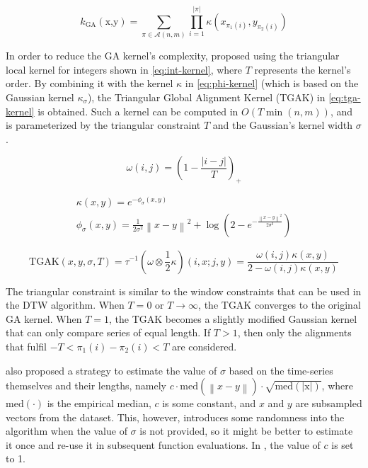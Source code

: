 \begin{equation}
\label{eq:ga-kernel}
k_{\text{GA}}(\text{x,y}) = \sum_{\pi \in \mathcal{A}(n,m)} \prod_{i=1}^{|\pi|} \kappa \left( x_{\pi_1(i)}, y_{\pi_2(i)} \right)
\end{equation}

In order to reduce the GA kernel's complexity,
\citet{cuturi2011} proposed using the triangular local kernel for integers shown in \cref{eq:int-kernel},
where $T$ represents the kernel's order.
By combining it with the kernel $\kappa$ in \cref{eq:phi-kernel}
(which is based on the Gaussian kernel $\kappa_\sigma$),
the Triangular Global Alignment Kernel (TGAK) in \cref{eq:tga-kernel} is obtained.
Such a kernel can be computed in $O(T \min(n,m))$,
and is parameterized by the triangular constraint $T$ and the Gaussian's kernel width $\sigma$.

\begin{equation}
\label{eq:int-kernel}
\omega(i,j) = \left( 1 - \frac{|i - j|}{T} \right)_{+}
\end{equation}

\begin{subequations}
\label{eq:phi-kernel}
\begin{gather}
\kappa (x,y) = e ^ {-\phi_\sigma(x,y)} \\
\phi_\sigma(x,y) = \frac{1}{2 \sigma ^ 2} \left\lVert x - y \right\rVert ^ 2 + \log \left( 2 - e ^ {-\frac{\left\lVert x - y \right\rVert ^ 2}{2 \sigma ^ 2}} \right)
\end{gather}
\end{subequations}

\begin{equation}
\label{eq:tga-kernel}
\text{TGAK}(x,y,\sigma,T) = \tau ^ {-1} \left( \omega \otimes \frac{1}{2} \kappa \right) (i,x;j,y) = \frac{\omega(i,j) \kappa (x,y)}{2 - \omega(i,j) \kappa (x,y)}
\end{equation}

The triangular constraint is similar to the window constraints that can be used in the DTW algorithm.
When $T = 0$ or $T \rightarrow \infty$,
the TGAK converges to the original GA kernel.
When $T = 1$, the TGAK becomes a slightly modified Gaussian kernel that can only compare series of equal length.
If $T > 1$, then only the alignments that fulfil $-T < \pi_1(i) - \pi_2(i) < T$ are considered.

\citet{cuturi2011} also proposed a strategy to estimate the value of $\sigma$ based on the time-series themselves and their lengths,
namely $c \cdot \text{med}(\left\lVert x - y \right\rVert) \cdot \sqrt{\text{med}(|\text{x}|)}$,
where $\text{med}(\cdot)$ is the empirical median,
$c$ is some constant,
and $x$ and $y$ are subsampled vectors from the dataset.
This, however, introduces some randomness into the algorithm when the value of $\sigma$ is not provided,
so it might be better to estimate it once and re-use it in subsequent function evaluations.
In \dtwclust{}, the value of $c$ is set to 1.

